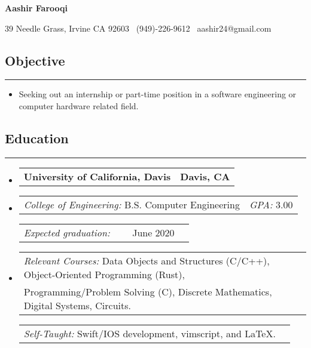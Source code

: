 \documentclass[10pt,letterpaper]{article}
\makeatletter
\newcommand{\items}[2]
{
	\begin{tabular*}{\linewidth}{l @{\extracolsep{\fill}} r}
		#1 & #2 \\
	\end{tabular*}
}
\newcommand{\header}[2]
{
	\begin{tabular*}{\linewidth}{l @{\extracolsep{\fill}} r}
		 #1 & #2 \\
	\end{tabular*}
}
\newcommand{\sectionbreak}
{
	\vspace{-1.2em}
	\rule{\textwidth}{1.7pt}
	\vspace{-1.7em}
}
\makeatother
\begin{document}
\begin{center}
{\LARGE \textbf{Aashir Farooqi}}

\vspace{0.5em}
39 Needle Grass, Irvine CA 92603 \textbar 
\ (949)-226-9612 \textbar 
\ aashir24@gmail.com \textbar
\ \href{https://github.com/AashPointO}{\emph{\underline{}}}
\\
\end{center}
\vspace{-20.65pt}

\subsection*{Objective}
\sectionbreak

\begin{itemize}
	\item[] Seeking out an internship or part-time position in a software engineering or computer hardware related field.

\end{itemize}

\vspace{-17.65pt}

\subsection*{Education}
\sectionbreak

\begin{itemize}

\item[] 
	\header
		{\textbf{University of California, Davis}}
		{\textbf{Davis, CA}}
\item[]
	\vspace{-2.5pt}
	\items
		{ \emph{College of Engineering:} B.S. Computer Engineering}
		{\emph{GPA:} 3.00}
	\items
		{\emph{Expected graduation:} \ \ \ \ June 2020}
		{}
\item[]
	\items
		{\emph{Relevant Courses:} Data Objects and Structures (C/C++), Object-Oriented Programming (Rust), \\ \hspace{74pt} Programming/Problem Solving (C), Discrete Mathematics, Digital Systems, Circuits.} 
		{}
	\items
		{\emph{Self-Taught:} \hspace{21pt} Swift/IOS development, vimscript, and \LaTeX.}
		{}
	
\end{itemize}
\end{document}
